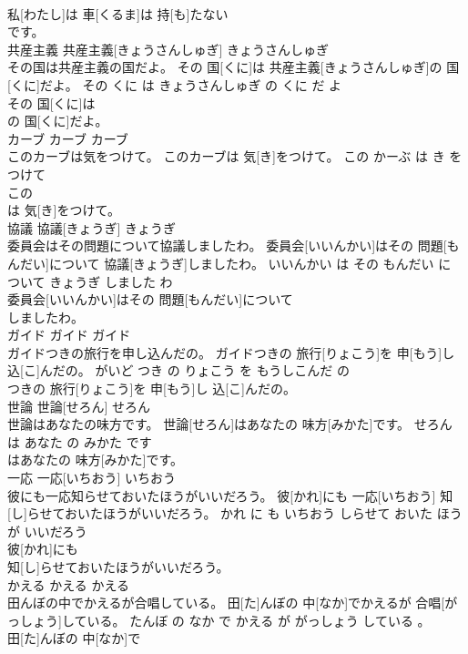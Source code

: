 \documentclass[8pt]{extreport}
\begin{document}
\begin{CJK}{UTF8}{min}
\\	私[わたし]は 車[くるま]は 持[も]たない
\\	です。			
\\	共産主義	共産主義[きょうさんしゅぎ]	きょうさんしゅぎ	
\\	その国は共産主義の国だよ。	その 国[くに]は 共産主義[きょうさんしゅぎ]の 国[くに]だよ。	その くに は きょうさんしゅぎ の くに だ よ	
\\	その 国[くに]は
\\	の 国[くに]だよ。			
\\	カーブ	カーブ	カーブ	
\\	このカーブは気をつけて。	このカーブは 気[き]をつけて。	この かーぶ は き を つけて	
\\	この
\\	は 気[き]をつけて。			
\\	協議	協議[きょうぎ]	きょうぎ	
\\	委員会はその問題について協議しましたわ。	委員会[いいんかい]はその 問題[もんだい]について 協議[きょうぎ]しましたわ。	いいんかい は その もんだい に ついて きょうぎ しました わ	
\\	委員会[いいんかい]はその 問題[もんだい]について
\\	しましたわ。			
\\	ガイド	ガイド	ガイド	
\\	ガイドつきの旅行を申し込んだの。	ガイドつきの 旅行[りょこう]を 申[もう]し 込[こ]んだの。	がいど つき の りょこう を もうしこんだ の	
\\	つきの 旅行[りょこう]を 申[もう]し 込[こ]んだの。			
\\	世論	世論[せろん]	せろん	
\\	世論はあなたの味方です。	世論[せろん]はあなたの 味方[みかた]です。	せろん は あなた の みかた です	
\\	はあなたの 味方[みかた]です。			
\\	一応	一応[いちおう]	いちおう	
\\	彼にも一応知らせておいたほうがいいだろう。	彼[かれ]にも 一応[いちおう] 知[し]らせておいたほうがいいだろう。	かれ に も いちおう しらせて おいた ほう が いいだろう	
\\	彼[かれ]にも
\\	知[し]らせておいたほうがいいだろう。			
\\	かえる	かえる	かえる	
\\	田んぼの中でかえるが合唱している。	田[た]んぼの 中[なか]でかえるが 合唱[がっしょう]している。	たんぼ の なか で かえる が がっしょう している 。	
\\	田[た]んぼの 中[なか]で

\end{CJK}
\end{document}
